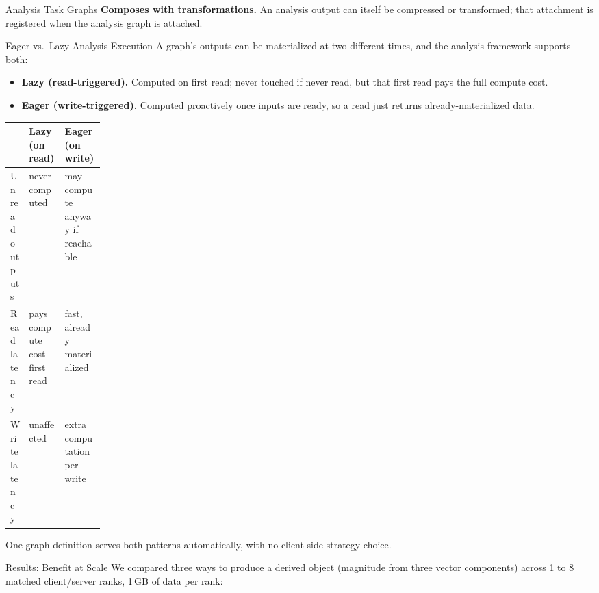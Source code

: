 \documentclass[final]{beamer}
\newlength{\colwid}
\begin{document}
\begin{frame}[t]
\begin{columns}[t]
\begin{column}{\colwid}
\begin{block}{Analysis Task Graphs}
\textbf{Composes with transformations.} An analysis output can itself be
compressed or transformed; that attachment is registered when the analysis
graph is attached.
\end{block}

\begin{block}{Eager vs.\ Lazy Analysis Execution}
A graph's outputs can be materialized at two different times, and the analysis
framework supports both:

\begin{itemize}
  \item \textbf{Lazy (read-triggered).} Computed on first read; never touched
        if never read, but that first read pays the full compute cost.
  \item \textbf{Eager (write-triggered).} Computed proactively once inputs are
        ready, so a read just returns already-materialized data.
\end{itemize}

\vspace{0.15cm}
\renewcommand{\arraystretch}{1.15}
\begin{tabularx}{\linewidth}{@{} >{\raggedright\arraybackslash}p{0.16\linewidth} | >{\raggedright\arraybackslash}X | >{\raggedright\arraybackslash}X @{}}
    \toprule
     & \textbf{Lazy (on read)} & \textbf{Eager (on write)} \\
    \midrule
    Unread outputs & never computed & may compute anyway if reachable \\
    Read latency & pays compute cost first read & fast, already materialized \\
    Write latency & unaffected & extra computation per write \\
    \bottomrule
\end{tabularx}
\vspace{0.1cm}

One graph definition serves both patterns automatically, with no client-side
strategy choice.
\end{block}

\begin{block}{Results: Benefit at Scale}
We compared three ways to produce a derived object (magnitude from three
vector components) across 1 to 8 matched client/server ranks, 1\,GB of data per
rank:


\end{block}
\end{column}
\end{columns}
\end{frame}
\end{document}
